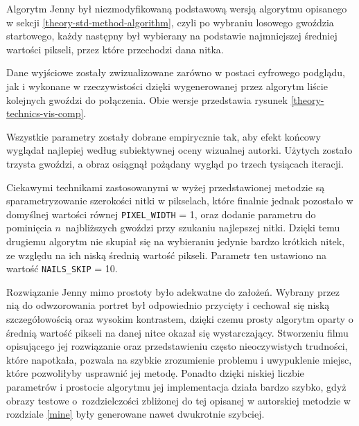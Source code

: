         Algorytm Jenny był niezmodyfikowaną podstawową wersją algorytmu opisanego w sekcji \ref{theory-std-method-algorithm}, czyli po wybraniu losowego gwoździa startowego, każdy następny był wybierany na podstawie najmniejszej średniej wartości pikseli, przez które przechodzi dana nitka. 
        
        Dane wyjściowe zostały zwizualizowane zarówno w postaci cyfrowego podglądu, jak i wykonane w rzeczywistości dzięki wygenerowanej przez algorytm liście kolejnych gwoździ do połączenia. Obie wersje przedstawia rysunek \ref{theory-technics-vis-comp}.
        
        Wszystkie parametry zostały dobrane empirycznie tak, aby efekt końcowy wyglądał najlepiej według subiektywnej oceny wizualnej autorki. Użytych zostało trzysta gwoździ, a obraz osiągnął pożądany wygląd po trzech tysiącach iteracji.
        
        Ciekawymi technikami zastosowanymi w wyżej przedstawionej metodzie są sparametryzowanie szerokości nitki w pikselach, które finalnie jednak pozostało w domyślnej wartości równej \texttt{PIXEL_WIDTH} = 1, oraz dodanie parametru do pominięcia \(n\)~najbliższych gwoździ przy szukaniu najlepszej nitki. Dzięki temu drugiemu algorytm nie skupiał się na wybieraniu jedynie bardzo krótkich nitek, ze względu na ich niską średnią wartość pikseli. Parametr ten ustawiono na wartość \texttt{NAILS_SKIP} = 10. 

        Rozwiązanie Jenny mimo prostoty było adekwatne do założeń. Wybrany przez nią do odwzorowania portret był odpowiednio przycięty i cechował się niską szczegółowością oraz wysokim kontrastem, dzięki czemu prosty algorytm oparty o średnią wartość pikseli na danej nitce okazał się wystarczający. Stworzeniu filmu opisującego jej rozwiązanie oraz przedstawieniu często nieoczywistych trudności, które napotkała, pozwala na szybkie zrozumienie problemu i uwypuklenie miejsc, które pozwoliłyby usprawnić jej metodę. Ponadto dzięki niskiej liczbie parametrów i prostocie algorytmu jej implementacja działa bardzo szybko, gdyż obrazy testowe o~rozdzielczości zbliżonej do tej opisanej w autorskiej metodzie w rozdziale \ref{mine} były generowane nawet dwukrotnie szybciej.
        
